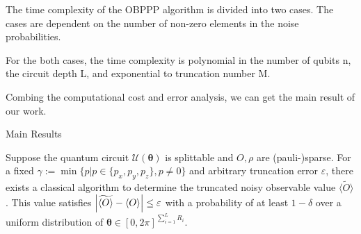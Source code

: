 \documentclass[10pt]{beamer}
\begin{document}
\begin{CJK}{UTF8}{gbsn}
{ The time complexity of the OBPPP algorithm is divided into two cases.
 The cases are dependent on the number of non-zero elements in the noise probabilities.
 
 For the both cases, the time complexity is polynomial in the number of qubits n, the circuit depth L, and exponential to truncation number M.

 Combing the computational cost and error analysis, we can get the main result of our work.
 



}

\begin{frame}[fragile]{Main Results}

\begin{mdframed}
\begin{theorem}\label{thm:main}
 Suppose the quantum circuit $\mathcal{U}(\bm{\theta})$ is splittable and $O,\rho$ are (pauli-)sparse. For a fixed $\gamma:=\min\{p|{p \in \{p_x,p_y,p_z\},p\neq 0}\}$ and arbitrary truncation error $\varepsilon$, there exists a classical algorithm to determine the truncated noisy observable value $\widetilde{\langle O \rangle}$. This value satisfies $\abs{\widetilde{\langle O \rangle}-\langle O \rangle} \leq \varepsilon$ with a probability of at least $1-\delta$ over a uniform distribution of $\bm{\theta}\in [0,2\pi]^{\sum_{i=1}^{L}R_i}$. 
 

\end{theorem}
\end{mdframed}
\end{frame}
\end{CJK}
\end{document}
